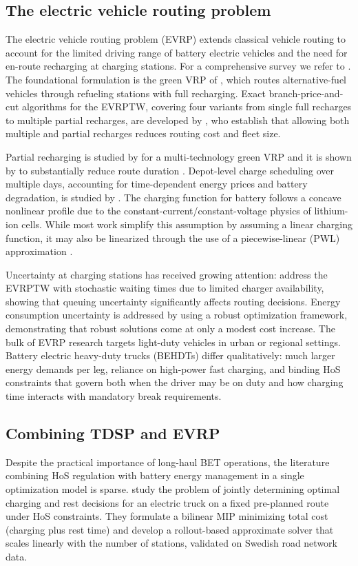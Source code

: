 \documentclass[preprint,12pt,3p]{elsarticle}
\begin{document}
\subsection{The electric vehicle routing problem}
The electric vehicle routing problem (EVRP) extends classical vehicle routing to account for the limited driving range of battery electric vehicles and the need for en-route recharging at charging stations. For a comprehensive survey we refer to \citet{erdelic_survey_2019}. The foundational formulation is the green VRP of \citet{erdogan_green_2012}, which routes alternative-fuel vehicles through refueling stations with full recharging. Exact branch-price-and-cut algorithms for the EVRPTW, covering four variants from single full recharges to multiple partial recharges, are developed by \citet{desaulniers_exact_2016}, who establish that allowing both multiple and partial recharges reduces routing cost and fleet size.

Partial recharging is studied by \citet{felipe_heuristic_2014} for a multi-technology green VRP and it is shown by \citet{keskin_partial_2016} to substantially reduce route duration . Depot-level charge scheduling over multiple days, accounting for time-dependent energy prices and battery degradation, is studied by \citet{pelletier_charge_2018}. The charging function for battery follows a concave nonlinear profile due to the constant-current/constant-voltage physics of lithium-ion cells. While most work simplify this assumption by assuming a linear charging function, it may also be linearized through the use of a piecewise-linear (PWL) approximation \citep{montoya_electric_2017}.

Uncertainty at charging stations has received growing attention: \citet{keskin_simulation-based_2021} address the EVRPTW with stochastic waiting times due to limited charger availability, showing that queuing uncertainty significantly affects routing decisions. Energy consumption uncertainty is addressed by \citet{pelletier_electric_2019} using a robust optimization framework, demonstrating that robust solutions come at only a modest cost increase. The bulk of EVRP research targets light-duty vehicles in urban or regional settings. Battery electric heavy-duty trucks (BEHDTs) differ qualitatively: much larger energy demands per leg, reliance on high-power fast charging, and binding HoS constraints that govern both when the driver may be on duty and how charging time interacts with mandatory break requirements.

\subsection{Combining TDSP and EVRP}
Despite the practical importance of long-haul BET operations, the literature combining HoS regulation with battery energy management in a single optimization model is sparse. \citet{bai_rollout-based_2023} study the problem of jointly determining optimal charging and rest decisions for an electric truck on a fixed pre-planned route under HoS constraints. They formulate a bilinear MIP minimizing total cost (charging plus rest time) and develop a rollout-based approximate solver that scales linearly with the number of stations, validated on Swedish road network data.
\end{document}
